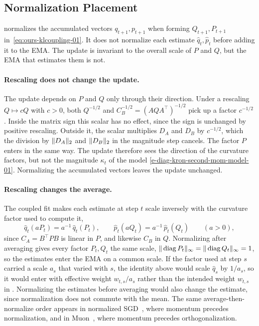 \subsection{Normalization Placement}
\label{sec:scale-placement-01}

\methodname{} normalizes the accumulated vectors $q_{t+1},p_{t+1}$ when
forming $Q_{t+1},P_{t+1}$ in~\eqref{eq:ours-klcoupling-01}. It does not
normalize each estimate $\hat{q}_t,\hat{p}_t$ before adding it to
the EMA. The update is invariant to the overall scale of $P$ and $Q$, but
the EMA that estimates them is not.

\paragraph{Rescaling does not change the update.}
The update depends on $P$ and $Q$ only through their direction. Under a
rescaling $Q\mapsto cQ$ with $c>0$, both $Q^{-1/2}$ and
$C_B^{-1/2}=(AQA^\top)^{-1/2}$ pick up a factor $c^{-1/2}$. Inside the
matrix sign this scalar has no effect, since the sign is unchanged by
positive rescaling. Outside it, the scalar multiplies $D_A$ and $D_B$ by
$c^{-1/2}$, which the division by $\| D_A\|_2$ and
$\| D_B\|_2$ in the magnitude step cancels. The factor $P$ enters in
the same way. The update therefore sees the direction of the curvature
factors, but not the magnitude $\kappa_t$ of the model
\eqref{e-diag-kron-second-mom-model-01}. Normalizing the accumulated
vectors leaves the update unchanged.

\paragraph{Rescaling changes the average.}
The coupled fit makes each estimate at step $t$ scale inversely with the
curvature factor used to compute it,
\[
  \hat{q}_t(aP_t)=a^{-1}\,\hat{q}_t(P_t),
  \qquad
  \hat{p}_t(aQ_t)=a^{-1}\,\hat{p}_t(Q_t)
  \qquad(a>0),
\]
since $C_A=B^\top PB$ is linear in $P$, and likewise $C_B$ in $Q$.
Normalizing after averaging gives every factor $P_t,Q_t$ the same scale,
$\| \operatorname{diag} P_t\|_\infty=\| \operatorname{diag} Q_t\|_\infty=1$, so the estimates
enter the EMA on a common scale. If the factor used at step
$s$ carried a scale $a_s$ that varied with $s$, the identity above would scale
$\hat{q}_s$ by $1/a_s$, so it would enter with effective weight
$w_{t,s}/a_s$ rather than the intended weight $w_{t,s}$ in
. Normalizing the estimates before
averaging would also change the estimate, since normalization does not
commute with the mean. The same average-then-normalize order appears in
normalized SGD~\cite{cutkosky_nigt}, where momentum precedes
normalization, and in Muon~\cite{denoise_ortho}, where momentum precedes
orthogonalization.
